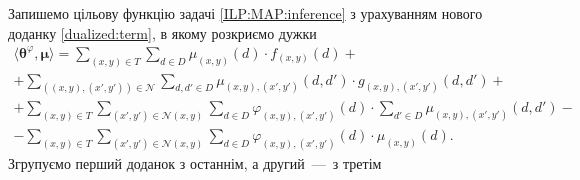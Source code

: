 Запишемо цільову функцію задачі \eqref{ILP:MAP:inference}
з урахуванням нового доданку \eqref{dualized:term}, в якому розкриємо дужки
\begin{equation*}
\begin{gathered}
    \langle \pmb{\theta}^{\varphi}, \pmb{\mu} \rangle =
    \sum \limits_{\left(x, y \right) \in T}
        \sum \limits_{d \in D}
            \mu_{\left(x, y \right)} \left(d \right) \cdot
            f_{\left(x, y \right)} \left( d \right) + \\
    + \sum \limits_{\left(\left(x, y \right), \left(x', y' \right) \right) \in \mathcal{N}}
        \sum \limits_{d, d' \in D}
            \mu_{\left(x, y \right), \left(x', y' \right)} \left(
                d, d'
            \right) \cdot
            g_{\left(x, y \right), \left(x', y' \right)} \left(
                d, d'
            \right) + \\
    + \sum \limits_{\left(x, y \right) \in T}
        \sum \limits_{\left(x', y' \right) \in \mathcal{N} \left(x, y \right)}
            \sum \limits_{d \in D}
                \varphi_{\left(x, y \right), \left(x', y' \right)} \left(
                    d
                \right) \cdot
                \sum \limits_{d' \in D}
                    \mu_{\left(x, y \right), \left(x', y' \right)} \left(
                        d, d'
                    \right) - \\
    - \sum \limits_{\left(x, y \right) \in T}
        \sum \limits_{\left(x', y' \right) \in \mathcal{N}\left(x, y \right)}
            \sum \limits_{d \in D}
                \varphi_{\left(x, y \right), \left(x', y' \right)} \left(
                    d
                \right) \cdot \mu_{\left(x, y \right)} \left(d \right).
\end{gathered}
\end{equation*}
Згрупуємо перший доданок з останнім, а другий~---~з третім
